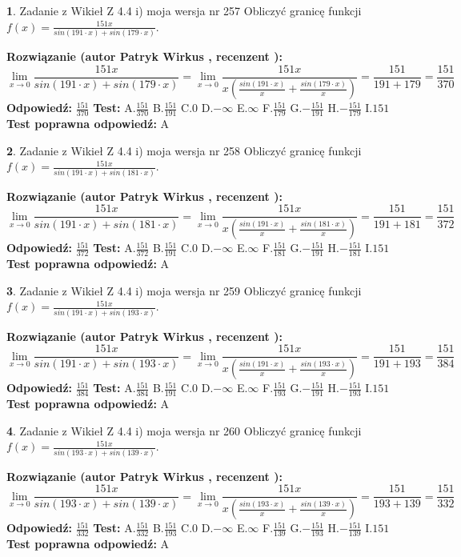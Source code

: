 \documentclass[12pt, a4paper]{article}
\theoremstyle{definition} %
\newtheorem{zad}{}
\newcommand{\zadStart}[1]{\begin{zad}#1\newline}
\newcommand{\zadStop}{\end{zad}}
\newcommand{\rozwStart}[2]{\noindent \textbf{Rozwiązanie (autor #1 , recenzent #2): }\newline}
\newcommand{\rozwStop}{\newline}
\newcommand{\odpStart}{\noindent \textbf{Odpowiedź:}\newline}
\newcommand{\odpStop}{\newline}
\newcommand{\testStart}{\noindent \textbf{Test:}\newline}
\newcommand{\testStop}{\newline}
\newcommand{\kluczStart}{\noindent \textbf{Test poprawna odpowiedź:}\newline}
\newcommand{\kluczStop}{\newline}
\begin{document}
\zadStart{Zadanie z Wikieł Z 4.4 i) moja wersja nr 257}
Obliczyć granicę funkcji $f(x)=\frac{151x}{sin(191\cdot x) +sin(179\cdot x)}$.
\zadStop
\rozwStart{Patryk Wirkus}{}
$$\lim\limits_{x\to 0}\frac{151x}{sin(191\cdot x) +sin(179\cdot x)}=\lim\limits_{x\to 0}\frac{151x}{x(\frac{sin(191\cdot x)}{x}+\frac{sin(179\cdot x)}{x})}=\frac{151}{191+179} = \frac{151}{370}$$
\rozwStop
\odpStart
$\frac{151}{370}$
\odpStop
\testStart
A.$\frac{151}{370}$
B.$\frac{151}{191}$
C.$0$
D.$-\infty$
E.$\infty$
F.$\frac{151}{179}$
G.$-\frac{151}{191}$
H.$-\frac{151}{179}$
I.$151$
\testStop
\kluczStart
A
\kluczStop



\zadStart{Zadanie z Wikieł Z 4.4 i) moja wersja nr 258}
Obliczyć granicę funkcji $f(x)=\frac{151x}{sin(191\cdot x) +sin(181\cdot x)}$.
\zadStop
\rozwStart{Patryk Wirkus}{}
$$\lim\limits_{x\to 0}\frac{151x}{sin(191\cdot x) +sin(181\cdot x)}=\lim\limits_{x\to 0}\frac{151x}{x(\frac{sin(191\cdot x)}{x}+\frac{sin(181\cdot x)}{x})}=\frac{151}{191+181} = \frac{151}{372}$$
\rozwStop
\odpStart
$\frac{151}{372}$
\odpStop
\testStart
A.$\frac{151}{372}$
B.$\frac{151}{191}$
C.$0$
D.$-\infty$
E.$\infty$
F.$\frac{151}{181}$
G.$-\frac{151}{191}$
H.$-\frac{151}{181}$
I.$151$
\testStop
\kluczStart
A
\kluczStop



\zadStart{Zadanie z Wikieł Z 4.4 i) moja wersja nr 259}
Obliczyć granicę funkcji $f(x)=\frac{151x}{sin(191\cdot x) +sin(193\cdot x)}$.
\zadStop
\rozwStart{Patryk Wirkus}{}
$$\lim\limits_{x\to 0}\frac{151x}{sin(191\cdot x) +sin(193\cdot x)}=\lim\limits_{x\to 0}\frac{151x}{x(\frac{sin(191\cdot x)}{x}+\frac{sin(193\cdot x)}{x})}=\frac{151}{191+193} = \frac{151}{384}$$
\rozwStop
\odpStart
$\frac{151}{384}$
\odpStop
\testStart
A.$\frac{151}{384}$
B.$\frac{151}{191}$
C.$0$
D.$-\infty$
E.$\infty$
F.$\frac{151}{193}$
G.$-\frac{151}{191}$
H.$-\frac{151}{193}$
I.$151$
\testStop
\kluczStart
A
\kluczStop



\zadStart{Zadanie z Wikieł Z 4.4 i) moja wersja nr 260}
Obliczyć granicę funkcji $f(x)=\frac{151x}{sin(193\cdot x) +sin(139\cdot x)}$.
\zadStop
\rozwStart{Patryk Wirkus}{}
$$\lim\limits_{x\to 0}\frac{151x}{sin(193\cdot x) +sin(139\cdot x)}=\lim\limits_{x\to 0}\frac{151x}{x(\frac{sin(193\cdot x)}{x}+\frac{sin(139\cdot x)}{x})}=\frac{151}{193+139} = \frac{151}{332}$$
\rozwStop
\odpStart
$\frac{151}{332}$
\odpStop
\testStart
A.$\frac{151}{332}$
B.$\frac{151}{193}$
C.$0$
D.$-\infty$
E.$\infty$
F.$\frac{151}{139}$
G.$-\frac{151}{193}$
H.$-\frac{151}{139}$
I.$151$
\testStop
\kluczStart
A
\kluczStop
\end{document}
